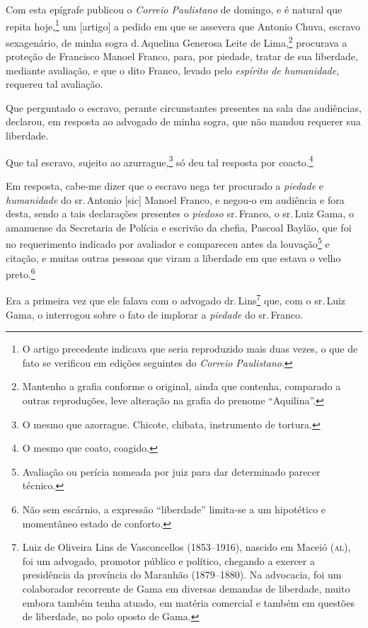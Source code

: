 Com esta epígrafe publicou o \emph{Correio Paulistano} de domingo, e é
natural que repita hoje,\footnote{ O artigo precedente indicava que
  seria reproduzido mais duas vezes, o que de fato se verificou em
  edições seguintes do \emph{Correio Paulistano}.} um {[}artigo{]} a
pedido em que se assevera que Antonio Chuva, escravo sexagenário, de
minha sogra d.\,Aquelina Generosa Leite de Lima,\footnote{ Mantenho a
  grafia conforme o original, ainda que contenha, comparado a outras
  reproduções, leve alteração na grafia do prenome ``Aquilina''.} procurava
a proteção de Francisco Manoel Franco, para, por piedade, tratar de sua
liberdade, mediante avaliação, e que o dito Franco, levado pelo
\emph{espírito de humanidade}, requereu tal avaliação.

Que perguntado o escravo, perante circunstantes presentes na sala das
audiências, declarou, em resposta ao advogado de minha sogra, que não
mandou requerer sua liberdade.

Que tal escravo, sujeito ao azurrague,\footnote{ O mesmo que azorrague.
  Chicote, chibata, instrumento de tortura.} só deu tal resposta por
coacto.\footnote{ O mesmo que coato, coagido.}

Em resposta, cabe-me dizer que o escravo nega ter procurado a
\emph{piedade} e \emph{humanidade} do sr.\,Antonio {[}sic{]} Manoel
Franco, e negou-o em audiência e fora desta, sendo a tais declarações
presentes o \emph{piedoso} sr.\,Franco, o sr.\,Luiz Gama, o amanuense da
Secretaria de Polícia e escrivão da chefia, Pascoal Baylão, que foi no
requerimento indicado por avaliador e compareceu antes da
louvação\footnote{ Avaliação ou perícia nomeada por juiz para dar
  determinado parecer técnico.} e citação, e muitas outras pessoas que
viram a liberdade em que estava o velho preto.\footnote{Não sem
  escárnio, a expressão ``liberdade'' limita-se a um hipotético e
  momentâneo estado de conforto.}

Era a primeira vez que ele falava com o advogado dr.\,Lins\footnote{
  Luiz de Oliveira Lins de Vasconcellos (1853--1916), nascido em Maceió
  (\textsc{al}), foi um advogado, promotor público e político, chegando a exercer
  a presidência da província do Maranhão (1879--1880). Na advocacia, foi
  um colaborador recorrente de Gama em diversas demandas de liberdade,
  muito embora também tenha atuado, em matéria comercial e também em
  questões de liberdade, no polo oposto de Gama.} que, com o sr.\,Luiz
Gama, o interrogou sobre o fato de implorar a \emph{piedade} do sr.\,Franco.

